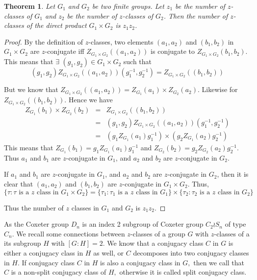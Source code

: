 \documentclass[12pt,twoside,reqno]{amsart}
\newtheorem{theorem}{Theorem}[section]
\theoremstyle{definition}
\numberwithin{equation}{section}
\begin{document}
\begin{theorem}\label{Direct_Product}
     Let $G_1$ and $G_2$ be two finite groups. Let $z_1$ be the number of $z$-classes of $G_1$ and $z_2$ be the number of $z$-classes of $G_2$. Then the number of $z$-classes of the direct product $G_1 \times G_2$ is $z_1z_2$.
 \end{theorem}
 \begin{proof} 

     By the definition of $z$-classes, two elements $(a_1,a_2)$ and $(b_1, b_2)$ in $G_1 \times G_2$ are $z$-conjugate iff $Z_{G_1\times G_2} ((a_1,a_2))$ is conjugate to $Z_{G_1 \times G_2}(b_1, b_2).$ 
     This means that $\exists$ $(g_1, g_2) \in G_1 \times G_2$ such that $$(g_1,g_2)Z_{G_1\times G_2} ((a_1,a_2))(g_1^{-1},g_2^{-1}) = Z_{G_1 \times G_2}((b_1, b_2))$$

     But we know that $Z_{G_1 \times G_2}((a_1,a_2)) = Z_{G_1}(a_1) \times Z_{G_2}(a_2)$. Likewise for $Z_{G_1 \times G_2}((b_1, b_2))$.
     Hence we have 
     \begin{eqnarray*}
        Z_{G_1}(b_1) \times Z_{G_2}(b_2) &=& Z_{G_1 \times G_2}((b_1, b_2))\\
        &=& (g_1,g_2)Z_{G_1\times G_2} ((a_1,a_2))(g_1^{-1},g_2^{-1})\\
        &=& (g_1Z_{G_1}(a_1)g_1^{-1}) \times (g_2Z_{G_1}(a_2)g_2^{-1})
     \end{eqnarray*}
     This means that $Z_{G_1}(b_1) = g_1Z_{G_1}(a_1)g_1^{-1}$  and $Z_{G_2}(b_2) = g_2Z_{G_2}(a_2)g_2^{-1}$. Thus $a_1$ and $b_1$ are $z$-conjugate in $G_1$, and $a_2$ and $b_2$ are $z$-conjugate in $G_2$. 

     If $a_1$ and $b_1$ are $z$-conjugate in $G_1$, and $a_2$ and $b_2$ are $z$-conjugate in $G_2$, then it is clear that $(a_1, a_2)$ and $(b_1, b_2)$ are $z$-conjugate in $G_1 \times G_2$. Thus, $$\{\tau: \tau\text{ is a $z$ class in }G_1\times G_2 \} = \{\tau_1: \tau_1\text{ is a $z$ class in }G_1\} \times \{\tau_2: \tau_2\text{ is a $z$ class in }G_2\}  $$

     Thus the number of $z$ classes in $G_1$ and $G_2$ is $z_1z_2$.
 \end{proof}

As the Coxeter group $D_n$ is an index 2 subgroup of Coxeter group $C_2 \wr S_n$ of type $C_n.$ We recall some connections between $z$-classes of a group $G$ with $z$-classes of a its subgroup $H$ with $[G:H]=2.$ We know that a conjugacy class $C$ in $G$ is either a conjugacy class in $H$ as well, or $C$ decomposes into two conjugacy classes in $H.$ If conjugacy class $C$ in $H$ is also a conjugacy class in $G,$ then we call that $C$ is a non-split conjugacy class of $H,$ otherwise it is called split conjugacy class.
\end{document}
